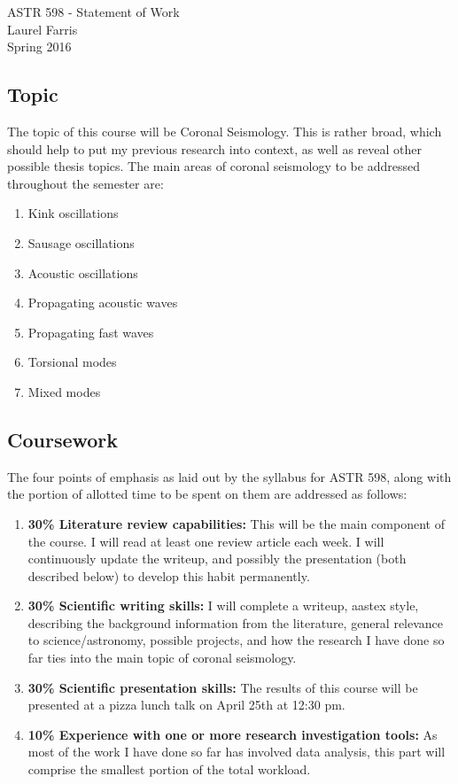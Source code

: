 \documentclass[12pt]{article}
\begin{document}
\begin{center}\Large
    \Large ASTR 598 - Statement of Work\\
    \large Laurel Farris\\
    \normalsize Spring 2016
\end{center}

\subsection*{Topic}
The topic of this course will be Coronal Seismology. This is rather
broad, which should help
to put my previous research into context, as well as reveal other
possible thesis topics. The
main areas of coronal seismology to be addressed throughout the
semester are:
\begin{enumerate}
    \item Kink oscillations
    \item Sausage oscillations
    \item Acoustic oscillations
    \item Propagating acoustic waves
    \item Propagating fast waves
    \item Torsional modes
    \item Mixed modes
\end{enumerate}

\subsection*{Coursework}
The four points of emphasis as laid out by the syllabus for ASTR 598,
along with the portion
of allotted time to be spent on them are addressed as follows:
\begin{enumerate}
    \item \textbf{30\% Literature review capabilities:}
        This will be the main component of the course.
        I will read at least one review article each week. I will
        continuously update the writeup,
        and possibly the presentation (both described below) to
        develop this habit permanently.
    \item \textbf{30\% Scientific writing skills:}
        I will complete a writeup, aastex style, describing the background
        information from the literature, general relevance to
        science/astronomy, possible projects,
        and how the research I have done so far ties into the main topic
        of coronal seismology.
    \item \textbf{30\% Scientific presentation skills:}
        The results of this course will be presented at a pizza lunch
        talk on April 25th at 12:30 pm.
    \item \textbf{10\% Experience with one or more research
        investigation tools:} 
        As most of the work I have done so far has involved data
        analysis, this part will comprise the smallest portion of the
        total workload.
\end{enumerate}
\end{document}
